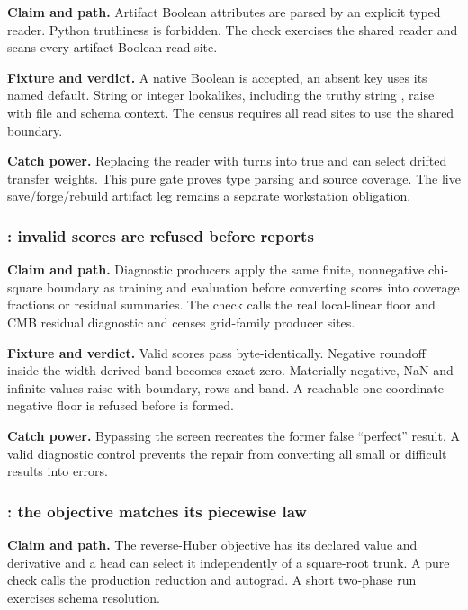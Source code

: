 \textbf{Claim and path.}  Artifact Boolean attributes are parsed by an
explicit typed reader.  Python truthiness is forbidden.  The check exercises the shared
reader and scans every artifact Boolean read site.

\textbf{Fixture and verdict.}  A native Boolean is accepted, an absent key
uses its named default.  String or integer lookalikes, including the
truthy string , raise with file and schema context.  The
census requires all read sites to use the shared boundary.

\textbf{Catch power.}  Replacing the reader with  turns
 into true and can select drifted transfer weights.  This
pure gate proves type parsing and source coverage.  The live save/forge/rebuild
artifact leg remains a separate workstation obligation.

\subsubsection{: invalid scores are refused before reports}

\textbf{Claim and path.}  Diagnostic producers apply the same finite,
nonnegative chi-square boundary as training and evaluation before converting
scores into coverage fractions or residual summaries.  The check calls the
real local-linear floor and CMB residual diagnostic and censes grid-family
producer sites.

\textbf{Fixture and verdict.}  Valid scores pass byte-identically.  Negative
roundoff inside the width-derived band becomes exact zero.  Materially negative,
NaN and infinite values raise with boundary, rows and band.  A reachable
one-coordinate negative floor is refused before  is formed.

\textbf{Catch power.}  Bypassing the screen recreates the former false
 ``perfect'' result.  A valid diagnostic control prevents the
repair from converting all small or difficult results into errors.

\subsubsection{: the objective matches its piecewise law}

\textbf{Claim and path.}  The reverse-Huber objective has its declared value
and derivative and a head can select it independently of a square-root
trunk.  A pure check calls the production reduction and autograd.  A short
two-phase run exercises schema resolution.

